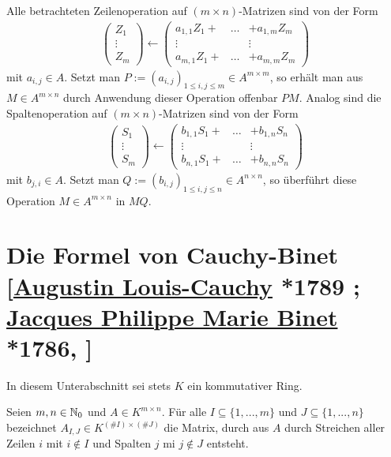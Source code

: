 \documentclass[../../main.tex]{subfiles}
\begin{document}
Alle betrachteten Zeilenoperation auf $(m\times n)$-Matrizen sind von der Form
\begin{align*}
\begin{pmatrix}Z_1\\\vdots\\ Z_m\end{pmatrix}\leftarrow\begin{pmatrix}a_{1,1}Z_1+&\hdots&+a_{1,m}Z_m\\\vdots&&\vdots\\ a_{m,1}Z_1+&\hdots&+a_{m,m}Z_m\end{pmatrix}
\end{align*}
mit $a_{i,j}\in A$. Setzt man $P:=(a_{i,j})_{1\le i,j\le m}\in A^{m\times m}$, so erhält man aus $M\in A^{m\times n}$ durch Anwendung dieser Operation offenbar $PM$. Analog sind die Spaltenoperation auf $(m\times n)$-Matrizen sind von der Form
\begin{align*}
\begin{pmatrix}S_1\\\vdots\\ S_m\end{pmatrix}\leftarrow\begin{pmatrix}b_{1,1}S_1+&\hdots&+b_{1,n}S_n\\\vdots&&\vdots\\ b_{n,1}S_1+&\hdots&+b_{n,n}S_n\end{pmatrix}
\end{align*}
mit $b_{j,i}\in A$. Setzt man $Q:=(b_{i,j})_{1\le i,j\le n}\in A^{n\times n}$, so überführt diese Operation $M\in A^{m\times n}$ in $MQ$.

\section[Die Formel von Cauchy-Binet]{Die Formel von Cauchy-Binet\\{\small[\href{https://de.wikipedia.org/wiki/Augustin-Louis_Cauchy}{Augustin Louis-Cauchy} *1789 ; \href{https://en.wikipedia.org/wiki/Jacques_Philippe_Marie_Binet}{Jacques Philippe Marie Binet} *1786, ]}}

In diesem Unterabschnitt sei stets $K$ ein kommutativer Ring.

\begin{df}\label{17.2.1}
Seien $m,n\in \mathbb N_0$ und $A\in K^{m\times n}$. Für alle $I\subseteq\{1,...,m\}$ und $J\subseteq\{1,...,n\}$ bezeichnet $A_{I,J}\in K^{(\#I)\times (\#J)}$ die Matrix, durch aus $A$ durch Streichen aller Zeilen $i$ mit $i\notin I$ und Spalten $j$ mi $j\notin J$ entsteht.
\end{df}
\end{document}
